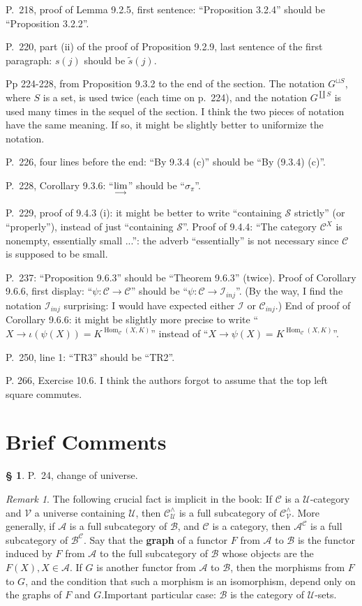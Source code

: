 \documentclass[12pt]{article}
\theoremstyle{remark}
\newtheorem{rk}[thm]{Remark}
\theoremstyle{definition}
\newtheorem{cm}[thm]{\S}
\newcommand{\bc}{\begin{cm}}\newcommand{\ec}{\end{cm}}
\newcommand{\n}{\noindent}
\newcommand{\A}{\mathcal A}
\newcommand{\B}{\mathcal B}
\newcommand{\C}{\mathcal C}
\newcommand{\U}{\mathcal U}
\newcommand{\ilim}{\operatornamewithlimits{\underset{\longrightarrow}{lim}}}
\DeclareMathOperator{\Hom}{Hom}
\begin{document}
\n P.~218, proof of Lemma 9.2.5, first sentence: ``Proposition 3.2.4'' should be ``Proposition 3.2.2''.

\n P.~220, part (ii) of the proof of Proposition 9.2.9, last sentence of the first paragraph: $s(j)$ should be $\tilde s(j)$.

\n Pp 224-228, from Proposition 9.3.2 to the end of the section. The notation $G^{\sqcup S}$, where $S$ is a set, is used twice (each time on p.~224), and the notation $G^{\coprod S}$ is used many times in the sequel of the section. I think the two pieces of notation have the same meaning. If so, it might be slightly better to uniformize the notation.

\n P.~226, four lines before the end: ``By 9.3.4 (c)'' should be ``By (9.3.4) (c)''.

\n P.~228, Corollary 9.3.6: ``$\ilim$'' should be ``$\sigma_\pi$''.

\n P.~229, proof of 9.4.3 (i): it might be better to write ``containing $\mathcal S$ strictly'' (or ``properly''), instead of just ``containing $\mathcal S$''. Proof of 9.4.4: ``The category $\C^X$ is nonempty, essentially small ...'': the adverb ``essentially'' is not necessary since $\C$ is supposed to be small.

\n P.~237: ``Proposition 9.6.3'' should be ``Theorem 9.6.3'' (twice). Proof of Corollary 9.6.6, first display: ``$\psi:\C\to\C$'' should be ``$\psi:\C\to\mathcal I_{inj}$''. (By the way, I find the notation $\mathcal I_{inj}$ surprising: I would have expected either $\mathcal I$ or $\C_{inj}$.) End of proof of Corollary 9.6.6: it might be slightly more precise to write ``$X\to\iota(\psi(X))=K^{\Hom_\C(X,K)}$'' instead of ``$X\to\psi(X)=K^{\Hom_\C(X,K)}$''. 

\n P.~250, line 1: ``TR3'' should be ``TR2''. 

\n P. 266, Exercise 10.6. I think the authors forgot to assume that the top left square commutes. 
%
\section{Brief Comments}\label{bc} %
%
\bc\label{cou} %
P.~24, change of universe. 
% 
\begin{rk}\label{graph} 
The following crucial fact is implicit in the book: If $\C$ is a $\U$-category and $\mathcal V$ a universe containing $\U$, then $\C^\wedge_\U$ is a full subcategory of $\C^\wedge_\mathcal{V}$. More generally, if $\A$ is a full subcategory of $\B$, and $\C$ is a category, then $\A^\C$ is a full subcategory of $\B^\C$. Say that the \textbf{graph} of a functor $F$ from $\A$ to $\B$ is the functor induced by $F$ from $\A$ to the full subcategory of $\B$ whose objects are the $F(X),X\in\A$. If $G$ is another functor from $\A$ to $\B$, then the morphisms from $F$ to $G$, and the condition that such a morphism is an isomorphism, depend only on the graphs of $F$ and $G$.Important particular case: $\B$ is the category of $\U$-sets. 
\end{rk}
\ec 
\end{document}
